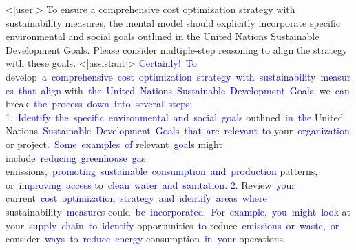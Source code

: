 \documentclass{article}
\begin{document}
\begin{tcolorbox}[colframe=black,colback=white]
<|user|>
To ensure a comprehensive cost optimization strategy with sustainability measures, the mental model should explicitly incorporate specific environmental and social goals outlined in the United Nations Sustainable Development Goals. Please consider multiple-step reasoning to align the strategy with these goals.
<|assistant|>
\textcolor{blue}{Certainly}\textcolor{blue}{!}\textcolor{blue}{~To} develop\textcolor{blue}{~a}\textcolor{blue}{~comprehensive}\textcolor{blue}{~cost}\textcolor{blue}{~optimization}\textcolor{blue}{~strategy}\textcolor{blue}{~with}\textcolor{blue}{~sustainability}\textcolor{blue}{~measures}\textcolor{blue}{~that}\textcolor{blue}{~align} with\textcolor{blue}{~the}\textcolor{blue}{~United}\textcolor{blue}{~Nations}\textcolor{blue}{~Sustainable}\textcolor{blue}{~Development}\textcolor{blue}{~Goals}, we\textcolor{blue}{~can} break\textcolor{blue}{~the}\textcolor{blue}{~process}\textcolor{blue}{~down}\textcolor{blue}{~into}\textcolor{blue}{~several}\textcolor{blue}{~steps}:
\textcolor{blue}{1}\textcolor{blue}{.}\textcolor{blue}{~Identify}\textcolor{blue}{~the}\textcolor{blue}{~specific}\textcolor{blue}{~environmental}\textcolor{blue}{~and}\textcolor{blue}{~social}\textcolor{blue}{~goals} outlined\textcolor{blue}{~in}\textcolor{blue}{~the} United Nations\textcolor{blue}{~Sustainable}\textcolor{blue}{~Development}\textcolor{blue}{~Goals}\textcolor{blue}{~that}\textcolor{blue}{~are}\textcolor{blue}{~relevant}\textcolor{blue}{~to} your\textcolor{blue}{~organization} or project\textcolor{blue}{.}\textcolor{blue}{~Some}\textcolor{blue}{~examples}\textcolor{blue}{~of} relevant\textcolor{blue}{~goals} might include\textcolor{blue}{~reducing}\textcolor{blue}{~greenhouse}\textcolor{blue}{~gas} emissions\textcolor{blue}{,}\textcolor{blue}{~promoting}\textcolor{blue}{~sustainable}\textcolor{blue}{~consumption}\textcolor{blue}{~and}\textcolor{blue}{~production} patterns\textcolor{blue}{,} or\textcolor{blue}{~improving}\textcolor{blue}{~access} to\textcolor{blue}{~clean}\textcolor{blue}{~water}\textcolor{blue}{~and}\textcolor{blue}{~sanitation}\textcolor{blue}{.
}\textcolor{blue}{2}\textcolor{blue}{.} Review\textcolor{blue}{~your} current\textcolor{blue}{~cost}\textcolor{blue}{~optimization}\textcolor{blue}{~strategy}\textcolor{blue}{~and}\textcolor{blue}{~identify}\textcolor{blue}{~areas}\textcolor{blue}{~where} sustainability\textcolor{blue}{~measures} could\textcolor{blue}{~be}\textcolor{blue}{~incorporated}\textcolor{blue}{.}\textcolor{blue}{~For}\textcolor{blue}{~example}\textcolor{blue}{,}\textcolor{blue}{~you}\textcolor{blue}{~might}\textcolor{blue}{~look} at your\textcolor{blue}{~supply}\textcolor{blue}{~chain}\textcolor{blue}{~to}\textcolor{blue}{~identify} opportunities\textcolor{blue}{~to} reduce\textcolor{blue}{~emissions}\textcolor{blue}{~or}\textcolor{blue}{~waste}\textcolor{blue}{,}\textcolor{blue}{~or} consider\textcolor{blue}{~ways}\textcolor{blue}{~to}\textcolor{blue}{~reduce}\textcolor{blue}{~energy} consumption\textcolor{blue}{~in}\textcolor{blue}{~your} operations\textcolor{blue}{.
}
\end{tcolorbox}
\end{document}
